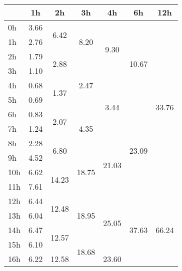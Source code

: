 \begin{center}
\begin{tabular}{| l || c | c | c | c | c | c |}\hline
 & 1h & 2h & 3h & 4h & 6h & 12h \\\hline
0h & \multirow{1}{*}{ 3.66 }  & \multirow{2}{*}{ 6.42 }  & \multirow{3}{*}{ 8.20 }  & \multirow{4}{*}{ 9.30 }  & \multirow{6}{*}{ 10.67 }  & \multirow{12}{*}{ 33.76 }  \\\cline{2-2}
1h & \multirow{1}{*}{ 2.76 }  & & & & & \\\cline{2-2}\cline{3-3}
2h & \multirow{1}{*}{ 1.79 }  & \multirow{2}{*}{ 2.88 }  & & & & \\\cline{2-2}\cline{4-4}
3h & \multirow{1}{*}{ 1.10 }  & & \multirow{3}{*}{ 2.47 }  & & & \\\cline{2-2}\cline{3-3}\cline{5-5}
4h & \multirow{1}{*}{ 0.68 }  & \multirow{2}{*}{ 1.37 }  & & \multirow{4}{*}{ 3.44 }  & & \\\cline{2-2}
5h & \multirow{1}{*}{ 0.69 }  & & & & & \\\cline{2-2}\cline{3-3}\cline{4-4}\cline{6-6}
6h & \multirow{1}{*}{ 0.83 }  & \multirow{2}{*}{ 2.07 }  & \multirow{3}{*}{ 4.35 }  & & \multirow{6}{*}{ 23.09 }  & \\\cline{2-2}
7h & \multirow{1}{*}{ 1.24 }  & & & & & \\\cline{2-2}\cline{3-3}\cline{5-5}
8h & \multirow{1}{*}{ 2.28 }  & \multirow{2}{*}{ 6.80 }  & & \multirow{4}{*}{ 21.03 }  & & \\\cline{2-2}\cline{4-4}
9h & \multirow{1}{*}{ 4.52 }  & & \multirow{3}{*}{ 18.75 }  & & & \\\cline{2-2}\cline{3-3}
10h & \multirow{1}{*}{ 6.62 }  & \multirow{2}{*}{ 14.23 }  & & & & \\\cline{2-2}
11h & \multirow{1}{*}{ 7.61 }  & & & & & \\\cline{2-2}\cline{3-3}\cline{4-4}\cline{5-5}\cline{6-6}\cline{7-7}
12h & \multirow{1}{*}{ 6.44 }  & \multirow{2}{*}{ 12.48 }  & \multirow{3}{*}{ 18.95 }  & \multirow{4}{*}{ 25.05 }  & \multirow{6}{*}{ 37.63 }  & \multirow{12}{*}{ 66.24 }  \\\cline{2-2}
13h & \multirow{1}{*}{ 6.04 }  & & & & & \\\cline{2-2}\cline{3-3}
14h & \multirow{1}{*}{ 6.47 }  & \multirow{2}{*}{ 12.57 }  & & & & \\\cline{2-2}\cline{4-4}
15h & \multirow{1}{*}{ 6.10 }  & & \multirow{3}{*}{ 18.68 }  & & & \\\cline{2-2}\cline{3-3}\cline{5-5}
16h & \multirow{1}{*}{ 6.22 }  & \multirow{2}{*}{ 12.58 }  & & \multirow{4}{*}{ 23.60 }  & & \\\cline{2-2}

\end{tabular}
\end{center}

